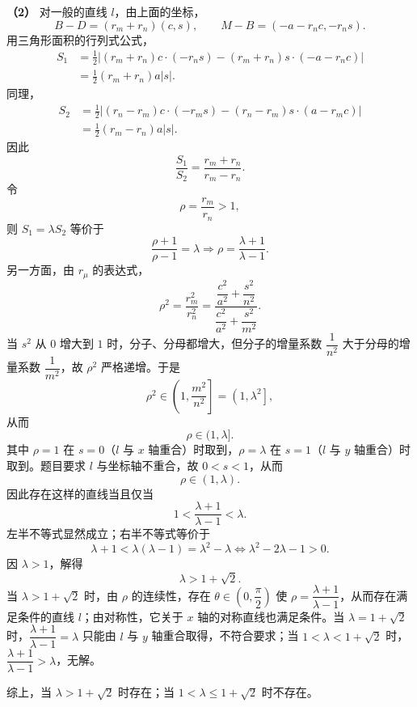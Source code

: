 \begin{answer}
\textbf{（2）} 对一般的直线 $l$，由上面的坐标，
\nopagebreak[4]
\[B-D=(r_m+r_n)(c,s),\qquad M-B=(-a-r_nc,-r_ns).\]
用三角形面积的行列式公式，
\nopagebreak[4]
\[\begin{aligned}
S_1&=\frac12\left|(r_m+r_n)c\cdot(-r_ns)-(r_m+r_n)s\cdot(-a-r_nc)\right|\\
&=\frac12(r_m+r_n)a|s|.
\end{aligned}\]
同理，
\nopagebreak[4]
\[\begin{aligned}
S_2&=\frac12\left|(r_n-r_m)c\cdot(-r_ms)-(r_n-r_m)s\cdot(a-r_mc)\right|\\
&=\frac12(r_m-r_n)a|s|.
\end{aligned}\]
因此
\nopagebreak[4]
\[\frac{S_1}{S_2}=\frac{r_m+r_n}{r_m-r_n}.\]
令
\nopagebreak[4]
\[\rho=\frac{r_m}{r_n}>1,\]
则 $S_1=\lambda S_2$ 等价于
\nopagebreak[4]
\[\frac{\rho+1}{\rho-1}=\lambda
\Longrightarrow\rho=\frac{\lambda+1}{\lambda-1}.\]
另一方面，由 $r_\mu$ 的表达式，
\nopagebreak[4]
\[\rho^2=\frac{r_m^2}{r_n^2}
=\frac{\dfrac{c^2}{a^2}+\dfrac{s^2}{n^2}}{\dfrac{c^2}{a^2}+\dfrac{s^2}{m^2}}.\]
当 $s^2$ 从 $0$ 增大到 $1$ 时，分子、分母都增大，但分子的增量系数 $\dfrac1{n^2}$ 大于分母的增量系数 $\dfrac1{m^2}$，故 $\rho^2$ 严格递增。于是
\nopagebreak[4]
\[\rho^2\in\left(1,\frac{m^2}{n^2}\right]=\left(1,\lambda^2\right],\]
从而
\nopagebreak[4]
\[\rho\in(1,\lambda].\]
其中 $\rho=1$ 在 $s=0$（$l$ 与 $x$ 轴重合）时取到，$\rho=\lambda$ 在 $s=1$（$l$ 与 $y$ 轴重合）时取到。题目要求 $l$ 与坐标轴不重合，故 $0<s<1$，从而
\nopagebreak[4]
\[\rho\in(1,\lambda).\]
因此存在这样的直线当且仅当
\nopagebreak[4]
\[1<\frac{\lambda+1}{\lambda-1}<\lambda.\]
左半不等式显然成立；右半不等式等价于
\nopagebreak[4]
\[\lambda+1<\lambda(\lambda-1)=\lambda^2-\lambda
\iff\lambda^2-2\lambda-1>0.\]
因 $\lambda>1$，解得
\nopagebreak[4]
\[\lambda>1+\sqrt2.\]
当 $\lambda>1+\sqrt2$ 时，由 $\rho$ 的连续性，存在 $\theta\in\left(0,\dfrac\pi2\right)$ 使 $\rho=\dfrac{\lambda+1}{\lambda-1}$，从而存在满足条件的直线 $l$；由对称性，它关于 $x$ 轴的对称直线也满足条件。当 $\lambda=1+\sqrt2$ 时，$\dfrac{\lambda+1}{\lambda-1}=\lambda$ 只能由 $l$ 与 $y$ 轴重合取得，不符合要求；当 $1<\lambda<1+\sqrt2$ 时，$\dfrac{\lambda+1}{\lambda-1}>\lambda$，无解。

综上，当 $\lambda>1+\sqrt2$ 时存在；当 $1<\lambda\leqslant1+\sqrt2$ 时不存在。



\end{answer}
